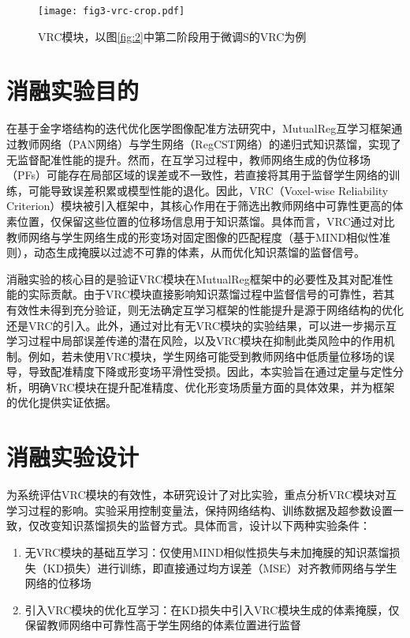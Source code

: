 \begin{figure}[h]
    \centering
    \texttt{[image: fig3-vrc-crop.pdf]}
    \caption{VRC模块，以图\ref{fig:2}中第二阶段用于微调S的VRC为例}
    \label{fig:3}
\end{figure}

\section{消融实验目的}

在基于金字塔结构的迭代优化医学图像配准方法研究中，MutualReg互学习框架通过教师网络（PAN网络）与学生网络（RegCST网络）的递归式知识蒸馏，实现了无监督配准性能的提升。然而，在互学习过程中，教师网络生成的伪位移场（PFs）可能存在局部区域的误差或不一致性，若直接将其用于监督学生网络的训练，可能导致误差积累或模型性能的退化。因此，VRC（Voxel-wise Reliability Criterion）模块被引入框架中，其核心作用在于筛选出教师网络中可靠性更高的体素位置，仅保留这些位置的位移场信息用于知识蒸馏。具体而言，VRC通过对比教师网络与学生网络生成的形变场对固定图像的匹配程度（基于MIND相似性准则），动态生成掩膜以过滤不可靠的体素，从而优化知识蒸馏的监督信号。

消融实验的核心目的是验证VRC模块在MutualReg框架中的必要性及其对配准性能的实际贡献。由于VRC模块直接影响知识蒸馏过程中监督信号的可靠性，若其有效性未得到充分验证，则无法确定互学习框架的性能提升是源于网络结构的优化还是VRC的引入。此外，通过对比有无VRC模块的实验结果，可以进一步揭示互学习过程中局部误差传递的潜在风险，以及VRC模块在抑制此类风险中的作用机制。例如，若未使用VRC模块，学生网络可能受到教师网络中低质量位移场的误导，导致配准精度下降或形变场平滑性受损。因此，本实验旨在通过定量与定性分析，明确VRC模块在提升配准精度、优化形变场质量方面的具体效果，并为框架的优化提供实证依据。

\section{消融实验设计}

为系统评估VRC模块的有效性，本研究设计了对比实验，重点分析VRC模块对互学习过程的影响。实验采用控制变量法，保持网络结构、训练数据及超参数设置一致，仅改变知识蒸馏损失的监督方式。具体而言，设计以下两种实验条件：

\begin{enumerate}
    \item 无VRC模块的基础互学习：仅使用MIND相似性损失与未加掩膜的知识蒸馏损失（KD损失）进行训练，即直接通过均方误差（MSE）对齐教师网络与学生网络的位移场
    \item 引入VRC模块的优化互学习：在KD损失中引入VRC模块生成的体素掩膜，仅保留教师网络中可靠性高于学生网络的体素位置进行监督
\end{enumerate}

